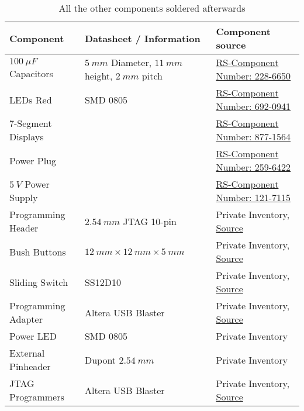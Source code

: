 \begin{table}[h!]
	\centering
	\begin{tabular}{|p{4.9cm}|p{4.9cm}|p{4.9cm}|}
		\hline
		Component & Datasheet / Information & Component source\\
		\hline
		$\SI{100}{\mu{}F}$ Capacitors & $\SI{5}{mm}$ Diameter, $\SI{11}{mm}$ height, $\SI{2}{mm}$ pitch & \href{https://de.rs-online.com/web/p/aluminium-elektrolytkondensatoren/2286650}{RS-Component Number: 228-6650} \\
		\hline
		LEDs Red & SMD 0805 & \href{https://de.rs-online.com/web/p/leds/6920941}{RS-Component Number: 692-0941} \\
		\hline
		7-Segment Displays & & \href{https://de.rs-online.com/web/p/led-displays/8771564}{RS-Component Number: 877-1564} \\
		\hline
		Power Plug & & \href{https://de.rs-online.com/web/p/dc-leistungs-steckverbinder/2596422}{RS-Component Number: 259-6422} \\
		\hline
		$\SI{5}{V}$ Power Supply & & \href{https://de.rs-online.com/web/p/steckernetzteile/1217115}{RS-Component Number: 121-7115} \\
		\hline
		Programming Header & $\SI{2,54}{mm}$ JTAG 10-pin & Private Inventory, \href{https://www.amazon.de/dp/B00R1LS3QY}{Source} \\
		\hline
		Bush Buttons & $\SI{12}{mm} \times \SI{12}{mm} \times \SI{5}{mm}$ & Private Inventory, \href{https://de.aliexpress.com/item/32726177349.html}{Source} \\
		\hline
		Sliding Switch & SS12D10 & Private Inventory, \href{https://de.aliexpress.com/item/4001325159135.html}{Source} \\
		\hline
		Programming Adapter & Altera USB Blaster & Private Inventory, \href{https://de.aliexpress.com/item/1005006124817358.html}{Source} \\
		\hline
		Power LED & SMD 0805 & Private Inventory \\
		\hline
		External Pinheader & Dupont $\SI{2.54}{mm}$ & Private Inventory \\
		\hline
		JTAG Programmers & Altera USB Blaster & Private Inventory, \href{https://de.aliexpress.com/item/1005006124817358.html}{Source} \\
		\hline
	\end{tabular}
	\caption{All the other components soldered afterwards}
	\label{tab:components_other}
\end{table}
